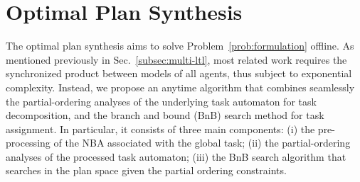 \section{Optimal Plan Synthesis}\label{subsec:initial-synthesis}
The optimal plan synthesis aims to solve Problem~\ref{prob:formulation} offline.
As mentioned previously in Sec.~\ref{subsec:multi-ltl},
most related work requires the synchronized product between models of all agents,
thus subject to exponential complexity.
Instead, we propose an anytime algorithm that combines seamlessly the partial-ordering analyses
of the underlying task automaton for task decomposition,
and the branch and bound (BnB) search method for task assignment.
In particular, it consists of three main components:
(i) the pre-processing of the NBA associated with the global task;
(ii) the partial-ordering analyses of the processed task automaton;
(iii) the BnB search algorithm that searches in the plan space
given the partial ordering constraints.
